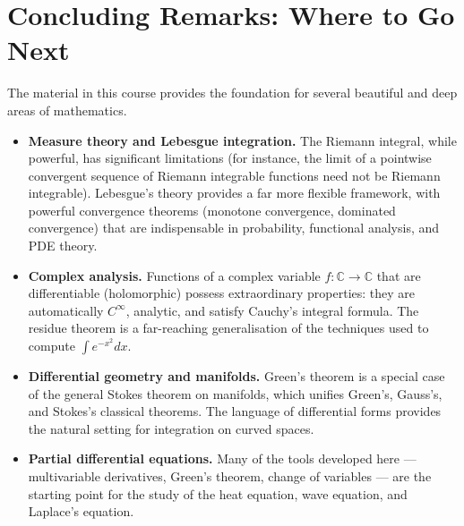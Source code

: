 \documentclass[12pt,a4paper]{book}
\theoremstyle{definition}
\begin{document}
\section*{Concluding Remarks: Where to Go Next}

The material in this course provides the foundation for several beautiful and
deep areas of mathematics.

\begin{itemize}
  \item \textbf{Measure theory and Lebesgue integration.}\; The Riemann
    integral, while powerful, has significant limitations (for instance, the
    limit of a pointwise convergent sequence of Riemann integrable functions
    need not be Riemann integrable).  Lebesgue's theory provides a far more
    flexible framework, with powerful convergence theorems (monotone
    convergence, dominated convergence) that are indispensable in
    probability, functional analysis, and PDE theory.
  \item \textbf{Complex analysis.}\; Functions of a complex variable
    $f\colon\mathbb{C}\to\mathbb{C}$ that are differentiable (holomorphic)
    possess extraordinary properties: they are automatically $C^\infty$,
    analytic, and satisfy Cauchy's integral formula.  The residue theorem is
    a far-reaching generalisation of the techniques used to compute
    $\int e^{-x^2}dx$.
  \item \textbf{Differential geometry and manifolds.}\; Green's theorem is a
    special case of the general Stokes theorem on manifolds, which unifies
    Green's, Gauss's, and Stokes's classical theorems.  The language of
    differential forms provides the natural setting for integration on curved
    spaces.
  \item \textbf{Partial differential equations.}\; Many of the tools
    developed here --- multivariable derivatives, Green's theorem,
    change of variables --- are the starting point for the study of the
    heat equation, wave equation, and Laplace's equation.
\end{itemize}


\end{document}
